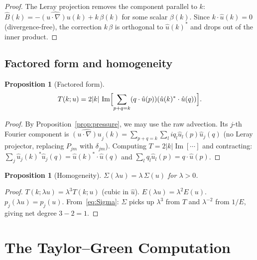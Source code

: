 \documentclass[11pt]{article}
\newtheorem{proposition}[theorem]{Proposition}
\theoremstyle{definition}
\DeclareMathOperator{\im}{Im}
\begin{document}
\begin{proof}
The Leray projection removes the component parallel
to $k$:
$\hat B(k) = -\widehat{(u\cdot\nabla)u}(k)
+ k\,\beta(k)$
for some scalar $\beta(k)$.  Since $k\cdot\hat u(k)=0$
(divergence-free), the correction $k\,\beta$ is
orthogonal to $\hat u(k)^*$ and drops out of the
inner product.
\end{proof}

\subsection{Factored form and homogeneity}

\begin{proposition}[Factored form]
\label{prop:factored}
\begin{equation}\label{eq:factored}
T(k;u) = 2|k|\,\im\Bigl[
\sum_{p+q=k}(q\cdot\hat u(p))(\hat u(k)^*\cdot\hat u(q))
\Bigr].
\end{equation}
\end{proposition}

\begin{proof}
By Proposition~\ref{prop:pressure}, we may use the raw
advection.  Its $j$-th Fourier component is
$\widehat{(u\cdot\nabla)u}_j(k)
= \sum_{p+q=k}\sum_l iq_l\hat u_l(p)\hat u_j(q)$
(no Leray projector, replacing $P_{jm}$ with $\delta_{jm}$).
Computing $T = 2|k|\im[\cdots]$ and contracting:
$\sum_j \hat u_j(k)^*\hat u_j(q) = \hat u(k)^*\cdot\hat u(q)$
and
$\sum_l q_l\hat u_l(p) = q\cdot\hat u(p)$.
\end{proof}

\begin{proposition}[Homogeneity]
\label{prop:homog}
$\Sigma(\lambda u) = \lambda\,\Sigma(u)$ for $\lambda>0$.
\end{proposition}

\begin{proof}
$T(k;\lambda u) = \lambda^3 T(k;u)$ (cubic in $\hat u$).
$E(\lambda u) = \lambda^2 E(u)$.  $p_j(\lambda u)=p_j(u)$.
From~\eqref{eq:Sigma}: $\Sigma$ picks up $\lambda^3$
from $T$ and $\lambda^{-2}$ from $1/E$, giving
net degree $3-2=1$.
\end{proof}

\section{The Taylor--Green Computation}
\label{sec:TG}
\end{document}
